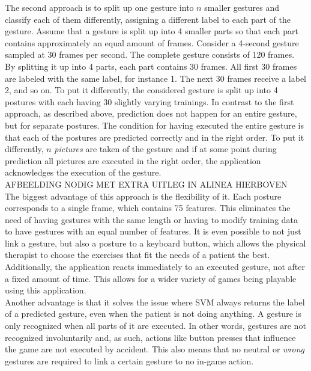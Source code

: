 The second approach is to split up one gesture into $n$ smaller gestures and classify each of them differently, assigning a different label to each part of the gesture. Assume that a gesture is split up into 4 smaller parts so that each part contains approximately an equal amount of frames. Consider a 4-second gesture sampled at 30 frames per second. The complete gesture consists of 120 frames. By splitting it up into 4 parts, each part contains 30 frames. All first 30 frames are labeled with the same label, for instance 1. The next 30 frames receive a label 2, and so on. To put it differently, the considered gesture is split up into 4 postures with each having 30 slightly varying trainings. In contrast to the first approach, as described above, prediction does not happen for an entire gesture, but for separate postures. The condition for having executed the entire gesture is that each of the postures are predicted correctly and in the right order. To put it differently, $n$ \emph{pictures} are taken of the gesture and if at some point during prediction all pictures are executed in the right order, the application acknowledges the execution of the gesture.\\

AFBEELDING NODIG MET EXTRA UITLEG IN ALINEA HIERBOVEN\\

The biggest advantage of this approach is the flexibility of it. Each posture corresponds to a single frame, which contains 75 features. This eliminates the need of having gestures with the same length or having to modify training data to have gestures with an equal number of features. It is even possible to not just link a gesture, but also a posture to a keyboard button, which allows the physical therapist to choose the exercises that fit the needs of a patient the best. Additionally, the application reacts immediately to an executed gesture, not after a fixed amount of time. This allows for a wider variety of games being playable using this application.\\

Another advantage is that it solves the issue where SVM always returns the label of a predicted gesture, even when the patient is not doing anything. A gesture is only recognized when all parts of it are executed. In other words, gestures are not recognized involuntarily and, as such, actions like button presses that influence the game are not executed by accident. This also means that no neutral or \emph{wrong} gestures are required to link a certain gesture to no in-game action.\\ %

